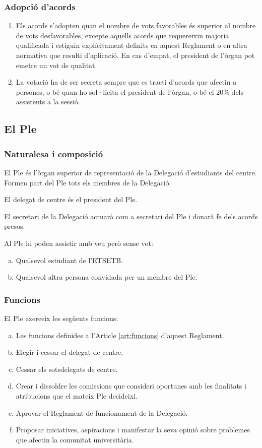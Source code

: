 \documentclass[a4paper,12pt]{article}
\renewcommand*{\thesubsubsection}{\arabic{subsubsection}}
\begin{document}
\subsubsection{Adopció d'acords}\label{art:acords}
\begin{enumerate}[\thesubsubsection.1]
	\item Els acords s'adopten quan el nombre de vots favorables és superior al nombre de vots desfavorables, excepte aquells acords que requereixin majoria qualificada i estiguin explícitament definits en aquest Reglament o en altra normativa que resulti d'aplicació. En cas d'empat, el president de l'òrgan pot emetre un vot de qualitat.
	\item La votació ha de ser secreta sempre que es tracti d'acords que afectin a persones, o bé quan ho sol·licita el president de l'òrgan, o bé el 20\% dels assistents a la sessió.
\end{enumerate}

\subsection{El Ple}
\subsubsection{Naturalesa i composició}
El Ple és l'òrgan superior de representació de la Delegació d'estudiants del centre. Formen part del Ple tots els membres de la Delegació.

El delegat de centre és el president del Ple.

El secretari de la Delegació actuarà com a secretari del Ple i donarà fe dels acords presos.

Al Ple hi poden assistir amb veu però sense vot:
\begin{enumerate}[a)]
	\item Qualsevol estudiant de l'ETSETB.
	\item Qualsevol altra persona convidada per un membre del Ple.
\end{enumerate}

\subsubsection{Funcions}
El Ple exerceix les següents funcions:
\begin{enumerate}[a)]
	\item Les funcions definides a l'Article \ref{art:funcions} d'aquest Reglament.
	\item Elegir i cessar el delegat de centre.
	\item Cessar els sotsdelegats de centre.
	\item Crear i dissoldre les comissions que consideri oportunes amb les finalitats i atribucions que el mateix Ple decideixi.
	\item Aprovar el Reglament de funcionament de la Delegació.
	\item Proposar iniciatives, aspiracions i manifestar la seva opinió sobre problemes que afectin la comunitat universitària.
\end{enumerate}
\end{document}
